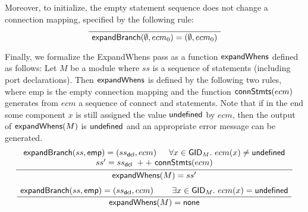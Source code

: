 Moreover, to initialize, the empty statement sequence does not change a connection mapping, specified by the following rule:
{\begin{gather*}
    \infer{\seqq{\expandbranch(\emptyset, ecm_0) = (\emptyset, ecm_0)}}
    {} %
\end{gather*}}

Finally, we formalize the ExpandWhens pass as a function ${\sf expandWhens}$ defined as follows: Let $M$ be a module where $ss$ is a sequence of statements (including port declarations).
Then ${\sf expandWhens}$ is defined by the following two rules, where {\sf emp} is the empty connection mapping and the function ${\sf connStmts}(ecm)$ generates from $ecm$ a sequence of connect and  statements.
Note that if in the end some component $x$ is still assigned the value ${\sf undefined}$ by $ecm$,
then the output of ${\sf expandWhens}(M)$ is ${\sf undefined}$ and an appropriate error message can be generated.
{\begin{gather*}
    \infer{\seqq{\expandwhens(M) = ss'}}
    {\begin{array}{c}
    \expandbranch(ss, {\sf emp}) = (ss_{\sf dcl}, ecm) \hspace{15pt} \seqq{\forall x \in \gidset_M.\ ecm(x) \neq \svundefined} \\
    ss'  = ss_{\sf dcl}\ ++\ \connstmts(ecm)
   \end{array}
   }
\\[1ex]
    \inferii{\seqq{\expandwhens(M) = \svnone}}
    {\seqq{\expandbranch(ss, {\sf emp}) = (ss_{\sf dcl}, ecm)}}
    {\seqq{\exists x \in \gidset_M.\ ecm(x) = \svundefined} }
\end{gather*}}


